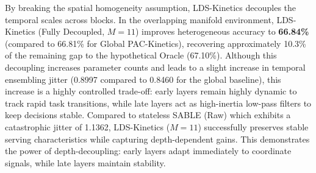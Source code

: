 By breaking the spatial homogeneity assumption, LDS-Kinetics decouples the temporal scales across blocks. In the overlapping manifold environment, LDS-Kinetics (Fully Decoupled, $M=11$) improves heterogeneous accuracy to \textbf{66.84\%} (compared to 66.81\% for Global PAC-Kinetics), recovering approximately 10.3\% of the remaining gap to the hypothetical Oracle (67.10\%). Although this decoupling increases parameter counts and leads to a slight increase in temporal ensembling jitter (0.8997 compared to 0.8460 for the global baseline), this increase is a highly controlled trade-off: early layers remain highly dynamic to track rapid task transitions, while late layers act as high-inertia low-pass filters to keep decisions stable. Compared to stateless SABLE (Raw) which exhibits a catastrophic jitter of 1.1362, LDS-Kinetics ($M=11$) successfully preserves stable serving characteristics while capturing depth-dependent gains. This demonstrates the power of depth-decoupling: early layers adapt immediately to coordinate signals, while late layers maintain stability.

